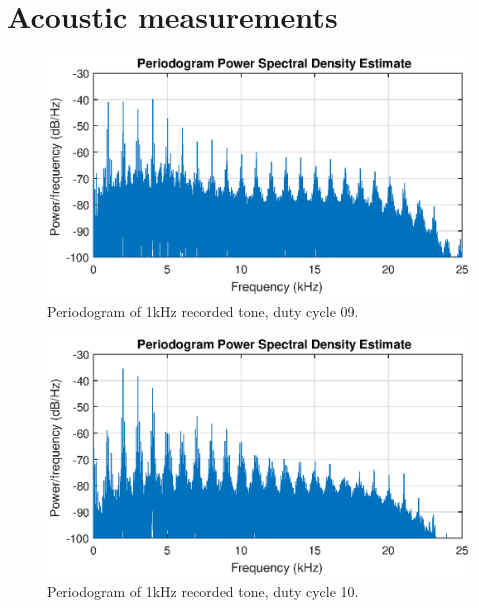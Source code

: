 \chapter{Acoustic measurements}

\newpage
\begin{figure}[H]
    \centering
    \includegraphics[trim={0cm 1.6cm 0cm 2cm},clip,width=\textwidth]{img/Periodogram_1khz-09.eps}
    \caption{Periodogram of 1kHz recorded tone, duty cycle 09.}
    \label{fig:appdx:period_1k-09}
\end{figure}
\begin{figure}[H]
    \centering
    \includegraphics[trim={0cm 1.6cm 0cm 2cm},clip,width=\textwidth]{img/akustisk/Periodogram_1kHz-10.eps}
    \caption{Periodogram of 1kHz recorded tone, duty cycle 10.}
    \label{fig:appdx:period_1k-10}
\end{figure}

